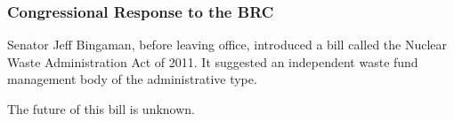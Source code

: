 
\begin{frame}[ctb!]
    \frametitle{Congressional Response to the BRC}
    Senator Jeff Bingaman, before leaving office, introduced a bill called the 
    Nuclear Waste Administration Act of 2011. It suggested an independent waste 
    fund management body of the administrative type. 

    The future of this bill is unknown. 
  \end{frame}


